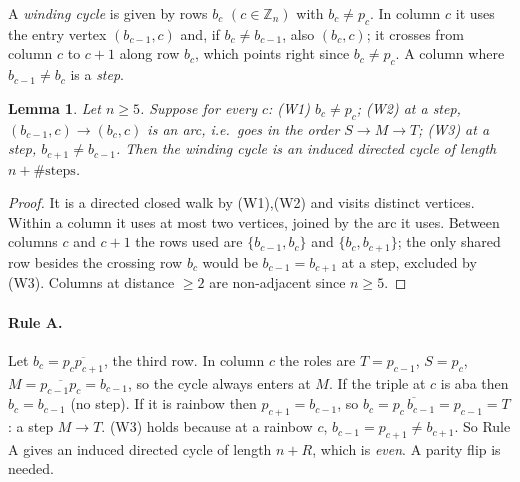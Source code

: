 \documentclass[11pt]{article}
\theoremstyle{plain}
\newtheorem{lemma}[theorem]{Lemma}
\theoremstyle{definition}
\theoremstyle{remark}
\begin{document}
A \emph{winding cycle} is given by rows $b_c$ $(c\in\mathbb Z_n)$ with $b_c\ne p_c$. In
column $c$ it uses the entry vertex $(b_{c-1},c)$ and, if $b_c\ne b_{c-1}$, also
$(b_c,c)$; it crosses from column $c$ to $c+1$ along row $b_c$, which points right since
$b_c\ne p_c$. A column where $b_{c-1}\ne b_c$ is a \emph{step}.

\begin{lemma}\label{lem:winding}
Let $n\ge5$. Suppose for every $c$: (W1) $b_c\ne p_c$; (W2) at a step, $(b_{c-1},c)\to(b_c,c)$
is an arc, i.e.\ goes in the order $S\to M\to T$; (W3) at a step,
$b_{c+1}\ne b_{c-1}$. Then the winding cycle is an induced directed cycle of length
$n+\#\text{steps}$.
\end{lemma}
\begin{proof}
It is a directed closed walk by (W1),(W2) and visits distinct vertices. Within a column
it uses at most two vertices, joined by the arc it uses. Between columns $c$ and $c+1$
the rows used are $\{b_{c-1},b_c\}$ and $\{b_c,b_{c+1}\}$; the only shared row besides the
crossing row $b_c$ would be $b_{c-1}=b_{c+1}$ at a step, excluded by (W3). Columns at
distance $\ge2$ are non-adjacent since $n\ge5$.
\end{proof}

\paragraph{Rule A.} Let $b_c=\overline{p_cp_{c+1}}$, the third row. In column $c$ the
roles are $T=p_{c-1}$, $S=p_c$, $M=\overline{p_{c-1}p_c}=b_{c-1}$, so the cycle always
enters at $M$. If the triple at $c$ is aba then $b_c=b_{c-1}$ (no step). If it is rainbow
then $p_{c+1}=b_{c-1}$, so $b_c=\overline{p_c\,b_{c-1}}=p_{c-1}=T$: a step $M\to T$.
(W3) holds because at a rainbow $c$, $b_{c-1}=p_{c+1}\ne b_{c+1}$. So Rule A gives an
induced directed cycle of length $n+R$, which is \emph{even}. A parity flip is needed.
\end{document}
